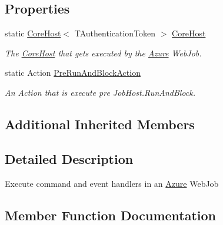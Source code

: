 \subsection*{Properties}
\begin{DoxyCompactItemize}
\item 
static \hyperlink{classCqrs_1_1Hosts_1_1CoreHost}{Core\+Host}$<$ T\+Authentication\+Token $>$ \hyperlink{classCqrs_1_1Azure_1_1WebJobs_1_1CqrsJobHost_a840ffdd7a98109cce3efd3ae3562941e_a840ffdd7a98109cce3efd3ae3562941e}{Core\+Host}
\begin{DoxyCompactList}\small\item\em The \hyperlink{classCqrs_1_1Azure_1_1WebJobs_1_1CqrsJobHost_a840ffdd7a98109cce3efd3ae3562941e_a840ffdd7a98109cce3efd3ae3562941e}{Core\+Host} that gets executed by the \hyperlink{namespaceCqrs_1_1Azure}{Azure} Web\+Job. \end{DoxyCompactList}\item 
static Action \hyperlink{classCqrs_1_1Azure_1_1WebJobs_1_1CqrsJobHost_afd124af2c14bb654b6fefd6842ceebeb_afd124af2c14bb654b6fefd6842ceebeb}{Pre\+Run\+And\+Block\+Action}
\begin{DoxyCompactList}\small\item\em An Action that is execute pre Job\+Host.\+Run\+And\+Block. \end{DoxyCompactList}\end{DoxyCompactItemize}
\subsection*{Additional Inherited Members}


\subsection{Detailed Description}
Execute command and event handlers in an \hyperlink{namespaceCqrs_1_1Azure}{Azure} Web\+Job 



\subsection{Member Function Documentation}
\mbox{\label{classCqrs_1_1Azure_1_1WebJobs_1_1CqrsJobHost_a836ef65628bb4b63942beedfb17f1269_a836ef65628bb4b63942beedfb17f1269}} 
